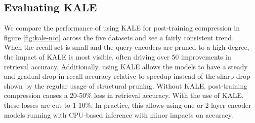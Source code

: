 \subsection{Evaluating KALE}
We compare the performance of using KALE for post-training compression in figure \ref{fig:kale-not} across the five datasets and see a fairly consistent trend. When the recall set is small and the query encoders are pruned to a high degree, the impact of KALE is most visible, often driving over 50 improvements in retrieval accuracy. Additionally, using KALE allows the models to have a steady and gradual drop in recall accuracy relative to speedup instead of the sharp drop shown by the regular usage of structural pruning.  Without KALE, post-training compression causes a 20-50\% loss in retrieval accuracy. With the use of KALE, these losses are cut to 1-10\%. In practice, this allows using one or 2-layer encoder models running with CPU-based inference with minor impacts on accuracy. \\
